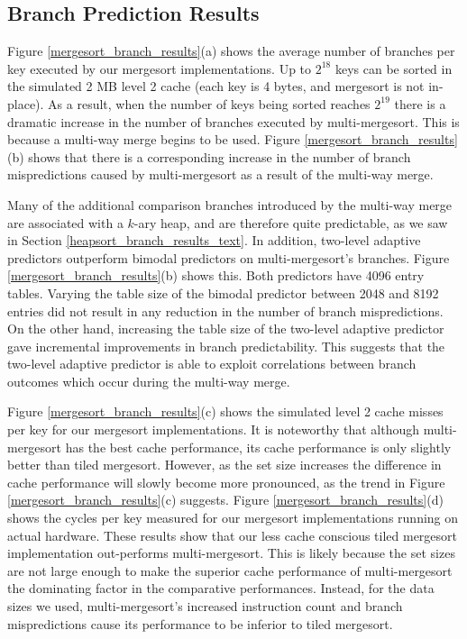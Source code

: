 \documentclass[acmtocl]{acmtrans2m}
\begin{document}
\subsection{Branch Prediction Results}
\label{mergesort_results_text}

Figure \ref{mergesort_branch_results}(a) shows the average number of branches per key executed by
our mergesort implementations. Up to $2^{18}$ keys can be sorted in the simulated 2 MB level 2 cache
(each key is 4 bytes, and mergesort is not in-place). As a result, when the number of keys being 
sorted reaches $2^{19}$ there is a dramatic increase in the number of branches executed by multi-mergesort. This
is because a multi-way merge begins to be used. Figure \ref{mergesort_branch_results}(b) 
shows that there is a corresponding increase in the number of branch
mispredictions caused by multi-mergesort as a result of the multi-way merge. 

Many of the additional comparison branches introduced by
the multi-way merge are associated with a $k$-ary heap, and are therefore quite predictable, as we saw in
Section \ref{heapsort_branch_results_text}. In addition, two-level adaptive predictors outperform bimodal predictors on multi-mergesort's branches.
Figure \ref{mergesort_branch_results}(b) shows this. Both predictors have 4096 entry tables. Varying the table size
of the bimodal predictor between 2048 and 8192 entries did not result in any reduction in the number of branch mispredictions.
On the other hand, increasing the table size of the two-level adaptive predictor gave incremental
improvements in branch predictability. This suggests that the two-level adaptive predictor is
able to exploit correlations between branch outcomes which occur during the multi-way merge.

Figure \ref{mergesort_branch_results}(c) shows the simulated level 2 cache misses per key for our mergesort
implementations. It is noteworthy that although multi-mergesort has the best cache performance, its cache
performance is only slightly better than tiled mergesort. However, as the set size increases the difference in cache
performance will slowly become more pronounced, as the trend in Figure \ref{mergesort_branch_results}(c) suggests. 
Figure \ref{mergesort_branch_results}(d) shows the cycles per key measured for our mergesort implementations
running on actual hardware. These results show that our less cache conscious tiled mergesort implementation
out-performs multi-mergesort. This is likely because the set sizes are not large enough to make the superior
cache performance of multi-mergesort the dominating factor in the comparative performances. Instead, for the 
data sizes we used, multi-mergesort's increased instruction count and branch mispredictions
cause its performance to be inferior to tiled mergesort.
\end{document}

